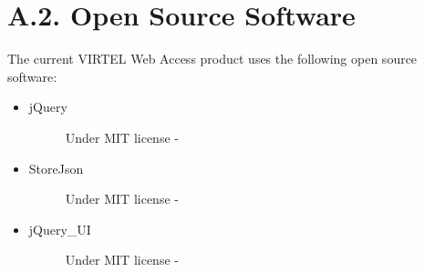 \documentclass[letterpaper,10pt,english]{sphinxmanual}
\begin{document}
\section{A.2. Open Source Software}
\label{\detokenize{connectivity_guide:a-2-open-source-software}}
The current VIRTEL Web Access product uses the following open source software:
\begin{itemize}
\item {} \begin{description}
\item[{jQuery}] \leavevmode
Under MIT license - 

\end{description}

\item {} \begin{description}
\item[{StoreJson}] \leavevmode
Under MIT license - 

\end{description}

\item {} \begin{description}
\item[{jQuery\_UI}] \leavevmode
Under MIT license - 

\end{description}

\end{itemize}



\renewcommand{\indexname}{Index}
\printindex
\end{document}
